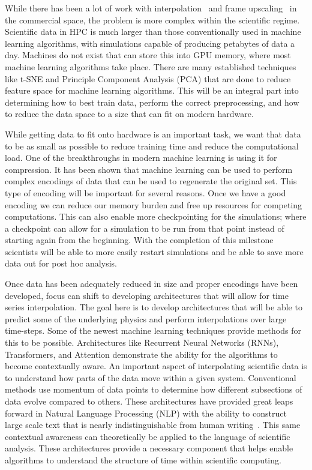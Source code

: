 \documentclass[12pt]{article}
\begin{document}
While there has been a lot of work with interpolation~\cite{} and frame
upscaling~\cite{} in the commercial space, the problem is more complex within
the scientific regime. Scientific data in HPC is much larger than those
conventionally used in machine learning algorithms, with simulations capable of
producing petabytes of data a day.  Machines do not exist that can store this
into GPU memory, where most machine learning algorithms take place. There are
many established techniques like t-SNE and Principle Component Analysis (PCA)
that are done to reduce feature space for machine learning algorithms. This will
be an integral part into determining how to best train data, perform the correct
preprocessing, and how to reduce the data space to a size that can fit on modern
hardware.

While getting data to fit onto hardware is an important task, we want that data
to be as small as possible to reduce training time and reduce the computational
load. One of the breakthroughs in modern machine learning is using it for
compression. It has been shown that machine learning can be used to perform
complex encodings of data that can be used to regenerate the original set. This
type of encoding will be important for several reasons. Once we have a good
encoding we can reduce our memory burden and free up resources for competing
computations. This can also enable more checkpointing for the simulations; where
a checkpoint can allow for a simulation to be run from that point instead of
starting again from the beginning. With the completion of this milestone
scientists will be able to more easily restart simulations and be able to save
more data out for post hoc analysis.

Once data has been adequately reduced in size and proper encodings have been
developed, focus can shift to developing architectures that will allow for time
series interpolation. The goal here is to develop architectures that will be
able to predict some of the underlying physics and perform interpolations over
large time-steps. Some of the newest machine learning techniques provide methods
for this to be possible. Architectures like Recurrent Neural Networks (RNNs),
Transformers, and Attention demonstrate the ability for the algorithms to
become contextually aware. An important aspect of interpolating scientific
data is to understand how parts of the data move within a given system.
Conventional methods use momentum of data points to determine how different
subsections of data evolve compared to others. These architectures have provided
great leaps forward in Natural Language Processing (NLP) with the ability to
construct large scale text that is nearly indistinguishable from human
writing~\cite{}. This same contextual awareness can theoretically be applied to
the language of scientific analysis. These architectures provide a necessary
component that helps enable algorithms to understand the structure of time
within scientific computing. 
\end{document}
